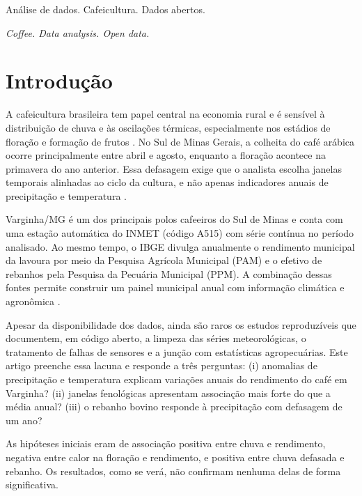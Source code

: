 \documentclass{RITA}
\begin{document}
\begin{keywords}
An\'alise de dados. Cafeicultura. Dados abertos.
\end{keywords}

\begin{keywordsenglish}
\emph{Coffee. Data analysis. Open data.}
\end{keywordsenglish}

\section{Introdu\c{c}\~ao}

A cafeicultura brasileira tem papel central na economia rural e \'e sens\'ivel \`a distribui\c{c}\~ao de chuva e \`as oscila\c{c}\~oes t\'ermicas, especialmente nos est\'adios de flora\c{c}\~ao e forma\c{c}\~ao de frutos \cite{ipcc2021,aparecido2016}. No Sul de Minas Gerais, a colheita do caf\'e ar\'abica ocorre principalmente entre abril e agosto, enquanto a flora\c{c}\~ao acontece na primavera do ano anterior. Essa defasagem exige que o analista escolha janelas temporais alinhadas ao ciclo da cultura, e n\~ao apenas indicadores anuais de precipita\c{c}\~ao e temperatura \cite{meireles2009}.

Varginha/MG \'e um dos principais polos cafeeiros do Sul de Minas e conta com uma esta\c{c}\~ao autom\'atica do INMET (c\'odigo A515) com s\'erie cont\'inua no per\'iodo analisado. Ao mesmo tempo, o IBGE divulga anualmente o rendimento municipal da lavoura por meio da Pesquisa Agr\'icola Municipal (PAM) e o efetivo de rebanhos pela Pesquisa da Pecu\'aria Municipal (PPM). A combina\c{c}\~ao dessas fontes permite construir um painel municipal anual com informa\c{c}\~ao clim\'atica e agron\^omica \cite{inmet2026,ibgePAM2025,ibgePPM2025}.

Apesar da disponibilidade dos dados, ainda s\~ao raros os estudos reproduz\'iveis que documentem, em c\'odigo aberto, a limpeza das s\'eries meteorol\'ogicas, o tratamento de falhas de sensores e a jun\c{c}\~ao com estat\'isticas agropecu\'arias. Este artigo preenche essa lacuna e responde a tr\^es perguntas: (i) anomalias de precipita\c{c}\~ao e temperatura explicam varia\c{c}\~oes anuais do rendimento do caf\'e em Varginha? (ii) janelas fenol\'ogicas apresentam associa\c{c}\~ao mais forte do que a m\'edia anual? (iii) o rebanho bovino responde \`a precipita\c{c}\~ao com defasagem de um ano?

As hip\'oteses iniciais eram de associa\c{c}\~ao positiva entre chuva e rendimento, negativa entre calor na flora\c{c}\~ao e rendimento, e positiva entre chuva defasada e rebanho. Os resultados, como se ver\'a, n\~ao confirmam nenhuma delas de forma significativa.
\end{document}
